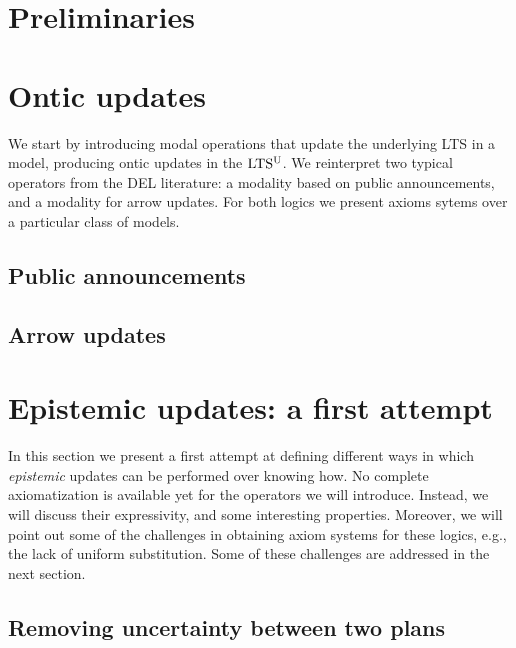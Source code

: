 \documentclass{sn-jnl}%
\begin{document}
\section{Preliminaries}
\label{sec:basic}




\section{Ontic updates}
\label{sec:ontic}

We start by introducing modal operations that update the underlying LTS in a model, producing ontic updates in the $\textup{LTS$^\text{\textup{U}}$}$. We reinterpret two typical operators from the DEL literature: a modality based on public announcements, and a modality for arrow updates. For both logics we present axioms sytems over a particular class of models.

\subsection{Public announcements}
\label{sec:pal}


\subsection{Arrow updates}
\label{sec:aul}


\section{Epistemic updates: a first attempt}
\label{sec:epistemic-basic} 

In this section we present a first attempt at defining different  
ways in which  \emph{epistemic} updates can be performed over knowing how. No complete axiomatization is
available yet for the operators we will introduce.  Instead, we will discuss their expressivity, and some interesting properties.
Moreover, we will point out some of the challenges in obtaining axiom systems for these logics, e.g., the lack of uniform substitution. Some of these challenges are addressed in the next section.

\subsection{Removing uncertainty between two plans}
\label{sec:ref}

\end{document}

